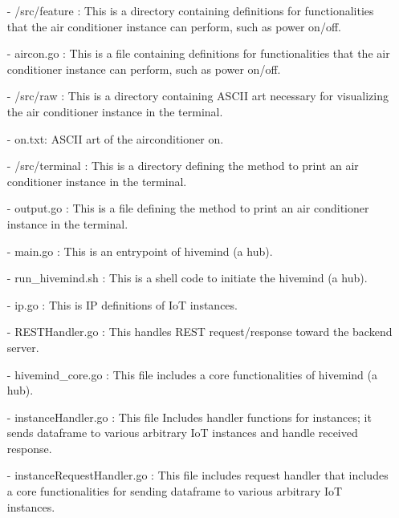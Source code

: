 \documentclass[conference]{IEEEtran}
\begin{document}
\begin{enumerate}
        \item[-] /src/feature : This is a directory containing definitions for functionalities that the air conditioner instance can perform, such as power on/off.\\
        \item[-] aircon.go : This is a file containing definitions for functionalities that the air conditioner instance can perform, such as power on/off.\\
        \item[-] /src/raw  : This is a directory containing ASCII art necessary for visualizing the air conditioner instance in the terminal.\\
        \item[-] on.txt: ASCII art of the airconditioner on. \\
        \item[-] /src/terminal : This is a directory defining the method to print an air conditioner instance in the terminal.\\
        \item[-]  output.go : This is a file defining the method to print an air conditioner instance in the terminal.\\
        \item[-] main.go : This is an entrypoint of hivemind (a hub).\\
        \item[-] run\_hivemind.sh : This is a shell code to initiate the hivemind (a hub).\\
        \item[-] ip.go : This is IP definitions of IoT instances.\\
        \item[-] RESTHandler.go : This handles REST request/response toward the backend server.\\
        \item[-] hivemind\_core.go : This file includes a core functionalities of hivemind (a hub). \\
        \item[-] instanceHandler.go : This file Includes handler functions for instances; it sends dataframe to various arbitrary IoT instances and handle received response.
 \\
        \item[-] instanceRequestHandler.go : This file includes request handler that includes a core functionalities for sending dataframe to various arbitrary IoT instances.
 \\

\end{enumerate}
\end{document}
